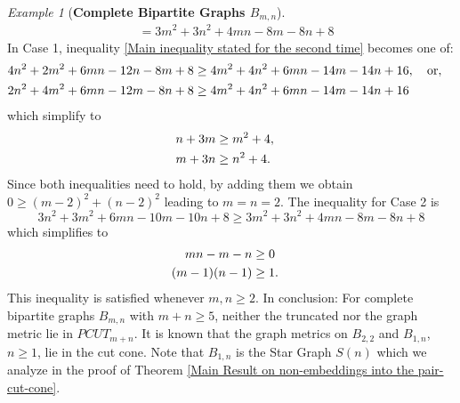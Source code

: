 \documentclass[12pt]{amsart}
\numberwithin{theorem}{section}
\theoremstyle{remark}
\newtheorem{example}[theorem]{Example}
\begin{document}
\begin{example}[{\bf Complete Bipartite Graphs $B_{m,n}$}]
\begin{align*}
& = 3m^2+3n^2+4mn-8m-8n+8
\end{align*}
In Case 1, inequality \eqref{Main inequality stated for the second time} becomes one of:
\begin{align*}
4n^2+2m^2+6mn-12n-8m+8 & \ge 4m^2+4n^2+6mn-14m-14n+16, \quad \text{or}, \cr 
2n^2+4m^2+6mn-12m-8n+8 & \ge 4m^2+4n^2+6mn-14m-14n+16
\end{align*} 
which simplify to 
\begin{align*}
n+3m & \ge m^2+4, \cr 
m+3n & \ge n^2+4.
\end{align*} 
Since both inequalities need to hold, by adding them we obtain $0\ge (m-2)^2+(n-2)^2$ leading to $m=n=2$. The inequality for Case 2 is 
$$3n^2+3m^2+6mn-10m-10n+8 \ge 3m^2+3n^2+4mn-8m-8n+8$$
which simplifies to 
\begin{align*}
mn-m-n & \ge 0 \cr 
(m-1)(n-1) & \ge  1.
\end{align*} 
This inequality is satisfied whenever $m,n\ge 2$. In conclusion:
\vskip2mm
  For complete bipartite graphs $B_{m,n}$ with $m+n\ge 5$, neither the truncated nor the graph metric lie in $PCUT_{m+n}$.
\vskip2mm
It is known that the graph metrics on $B_{2,2}$ and $B_{1,n}$, $n\ge 1$, lie in the cut cone. Note that $B_{1,n}$ is the Star Graph $S(n)$ which we analyze in the proof of Theorem \ref{Main Result on non-embeddings into the pair-cut-cone}.
\end{example}
\vskip3mm
\end{document}
